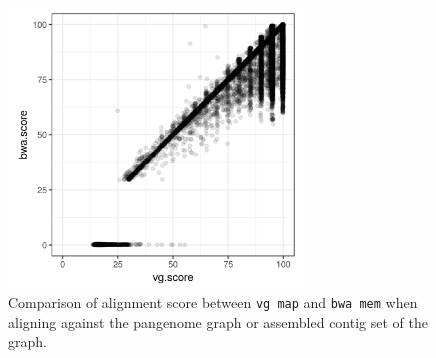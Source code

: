 \begin{figure}[htbp!]
  \centering
  \includegraphics[width=0.7\textwidth]{Chapter3/Figs/ERR414817_holdout_bwa_vs_vg_k51_m3.png}
  \caption[Comparing {\tt vg} and {\tt bwa} alignment to the viral metagenome]{
    Comparison of alignment score between {\tt vg map} and {\tt bwa mem} when aligning against the pangenome graph or assembled contig set of the graph.
  }
  \label{fig:viral_metagenome_scatter}
\end{figure}

